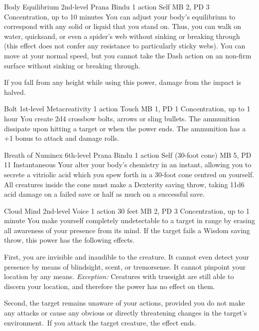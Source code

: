 \DndPowerHeader%
  {Body Equilibrium}
  {2nd-level Prana Bindu}
  {1 action}
  {Self}
  {MB 2, PD 3}
  {Concentration, up to 10 minutes}
You can adjust your body's equilibrium to correspond
with any solid or liquid that you stand on.
Thus, you can walk on water, quicksand,
or even a spider's web without sinking or breaking through
(this effect does not confer any resistance to particularly sticky webs).
You can move at your normal speed,
but you cannot take the Dash action
on an non-firm surface without sinking or breaking through.

If you fall from any height while using this power,
damage from the impact is halved.

\DndPowerHeader%
  {Bolt}
  {1st-level Metacreativity}
  {1 action}
  {Touch}
  {MB 1, PD 1}
  {Concentration, up to 1 hour}
You create 2d4 crossbow bolts, arrows or sling bullets.
The ammunition dissipate upon hitting a target
or when the power ends.
The ammunition has a +1 bonus to attack and damage rolls.

\DndPowerHeader%
  {Breath of Numinex}
  {6th-level Prana Bindu}
  {1 action}
  {Self (30-foot cone)}
  {MB 5, PD 11}
  {Instantaneous}
Your alter your body's chemistry in an instant,
allowing you to secrete a vitriolic acid
which you spew forth in a 30-foot cone
centred on yourself.
All creatures inside the cone must make a
Dexterity saving throw,
taking 11d6 acid damage on a failed save
or half as much on a successful save. 

\DndPowerHeader%
  {Cloud Mind}
  {2nd-level Voice}
  {1 action}
  {30 feet}
  {MB 2, PD 3}
  {Concentration, up to 1 minute}
You make yourself completely undetectable to a target in range
by erasing all awareness of your presence from its mind.
If the target fails a Wisdom saving throw,
this power has the following effects.

First, you are invisible and inaudible to the creature.
It cannot even detect your presence by means of blindsight,
scent, or tremorsense.
It cannot pinpoint your location by any means.
\textit{Exception:} Creatures with truesight are still
able to discern your location,
and therefore the power has no effect on them.
  
Second, the target remains unaware of your actions,
provided you do not make any attacks or cause any obvious
or directly threatening changes in the target's environment.\
If you attack the target creature, the effect ends.
  
